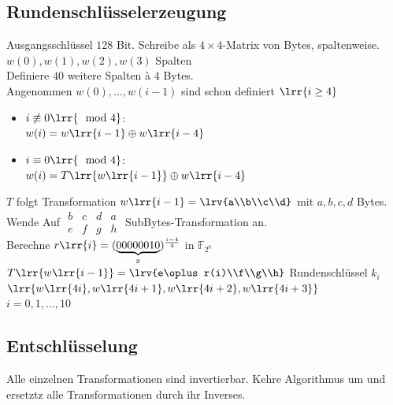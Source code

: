 	\subsection{Rundenschlüsselerzeugung}
		Ausgangsschlüssel $128$ Bit. Schreibe als $4\times 4$-Matrix von Bytes, spaltenweise.\\
		$w(0),w(1),w(2),w(3)$ Spalten \\
		Definiere $40$ weitere Spalten à $4$ Bytes.\\
		Angenommen $w(0),\dots,w(i-1)$ sind schon definiert $\lrr{i\geq 4}$
		\begin{itemize}
			\item $i\not\equiv 0\lrr{\mod 4}$:\\
				$w(i)=w\lrr{i-1}\oplus w\lrr{i-4}$
			\item $i\equiv 0\lrr{\mod 4}$:\\
				$w(i)=T\lrr{w\lrr{i-1}}\oplus w\lrr{i-4}$
		\end{itemize}
		$T$ folgt Transformation $w\lrr{i-1}=\lrv{a\\b\\c\\d}$ mit $a,b,c,d$ Bytes.\\
		Wende Auf $\begin{array}{cccc}b&c&d&a\\e&f&g&h\end{array}$ SubBytes-Transformation an.\\
		Berechne $r\lrr{i}=(\underbrace{00000010}_{x})^{\frac{i-4}{4}}$ in $\mathbb{F}_{2^8}$\\
		$T\lrr{w\lrr{i-1}}=\lrv{e\oplus r(i)\\f\\g\\h}$ Rundenschlüssel $k_i$\\
		$\lrr{w\lrr{4i},w\lrr{4i+1},w\lrr{4i+2},w\lrr{4i+3}}$\\
		$i=0,1,\dots,10$
		
	\subsection{Entschlüsselung}
		Alle einzelnen Transformationen sind invertierbar. Kehre Algorithmus um und ersetztz alle Transformationen durch ihr Inverses.
		
